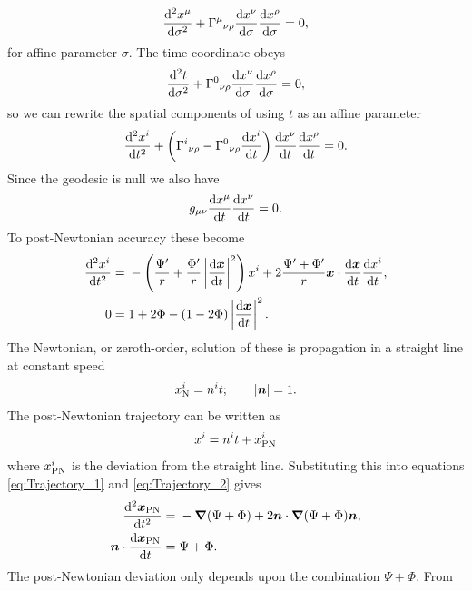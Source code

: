 \begin{equation}
\frac{\mathrm{d}^2 {x^\mu}}{\mathrm{d} {\sigma}^2} + {\Gamma^\mu}_{\nu\rho}\frac{\mathrm{d} {x^\nu}}{\mathrm{d} {\sigma}}\frac{\mathrm{d} {x^\rho}}{\mathrm{d} {\sigma}} = 0,
\label{eq:Geodesic}
\end{equation}
for affine parameter $\sigma$. The time coordinate obeys
\begin{equation}
\frac{\mathrm{d}^2 {t}}{\mathrm{d} {\sigma}^2} + {\Gamma^0}_{\nu\rho}\frac{\mathrm{d} {x^\nu}}{\mathrm{d} {\sigma}}\frac{\mathrm{d} {x^\rho}}{\mathrm{d} {\sigma}} = 0,
\end{equation}
so we can rewrite the spatial components of  using $t$ as an affine parameter \citep[section 6.1]{Will1993}
\begin{equation}
\frac{\mathrm{d}^2 {x^i}}{\mathrm{d} {t}^2} + \left({\Gamma^i}_{\nu\rho} - {\Gamma^0}_{\nu\rho}\frac{\mathrm{d} {x^i}}{\mathrm{d} {t}}\right)\frac{\mathrm{d} {x^\nu}}{\mathrm{d} {t}}\frac{\mathrm{d} {x^\rho}}{\mathrm{d} {t}} = 0.
\end{equation}
Since the geodesic is null we also have
\begin{equation}
g_{\mu\nu}\frac{\mathrm{d} {x^\mu}}{\mathrm{d} {t}}\frac{\mathrm{d} {x^\nu}}{\mathrm{d} {t}} = 0.
\end{equation}
To post-Newtonian accuracy these become
\begin{align}
\label{eq:Trajectory_1}
\frac{\mathrm{d}^2 {x^i}}{\mathrm{d} {t}^2} = {} & -\left(\frac{\Psi'}{r} + \frac{\Phi'}{r}\left|\frac{\mathrm{d} {\boldsymbol{x}}}{\mathrm{d} {t}}\right|^2\right)x^i + 2\frac{\Psi' + \Phi'}{r}\boldsymbol{x}\cdot\frac{\mathrm{d} {\boldsymbol{x}}}{\mathrm{d} {t}}\frac{\mathrm{d} {x^i}}{\mathrm{d} {t}}, \\
0 = {} & 1 + 2\Phi - \left(1 - 2\Phi\right)\left|\frac{\mathrm{d} {\boldsymbol{x}}}{\mathrm{d} {t}}\right|^2.
\label{eq:Trajectory_2}
\end{align}
The Newtonian, or zeroth-order, solution of these is propagation in a straight line at constant speed \citep[section 6.1]{Will1993}
\begin{equation}
x^i_\mathrm{N} = n^it; \qquad |\boldsymbol{n}| = 1.
\end{equation}
The post-Newtonian trajectory can be written as
\begin{equation}
x^i = n^it + x^i_\mathrm{PN}
\end{equation}
where $x^i_\mathrm{PN}$ is the deviation from the straight line. Substituting this into equations \eqref{eq:Trajectory_1} and \eqref{eq:Trajectory_2} gives
\begin{align}
\frac{\mathrm{d}^2 {\boldsymbol{x}_\mathrm{PN}}}{\mathrm{d} {t}^2} = {} & -\boldsymbol{\nabla}(\Psi + \Phi) + 2\boldsymbol{n}\cdot\boldsymbol{\nabla}(\Psi + \Phi)\boldsymbol{n}, \\
\boldsymbol{n}\cdot\frac{\mathrm{d} {\boldsymbol{x}_\mathrm{PN}}}{\mathrm{d} {t}} = {} & \Psi + \Phi.
\end{align}
The post-Newtonian deviation only depends upon the combination $\Psi + \Phi$. From 

